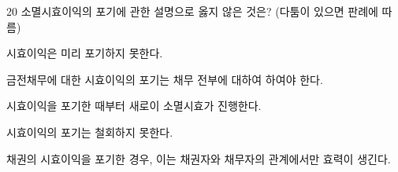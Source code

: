 \begin{question}{20}
소멸시효이익의 포기에 관한 설명으로 옳지 않은 것은? (다툼이 있으면 판례에 따름)
\begin{choices}
  \item 시효이익은 미리 포기하지 못한다.
  \item 금전채무에 대한 시효이익의 포기는 채무 전부에 대하여 하여야 한다.
  \item 시효이익을 포기한 때부터 새로이 소멸시효가 진행한다.
  \item 시효이익의 포기는 철회하지 못한다.
  \item 채권의 시효이익을 포기한 경우, 이는 채권자와 채무자의 관계에서만 효력이 생긴다.
\end{choices}
\end{question}
